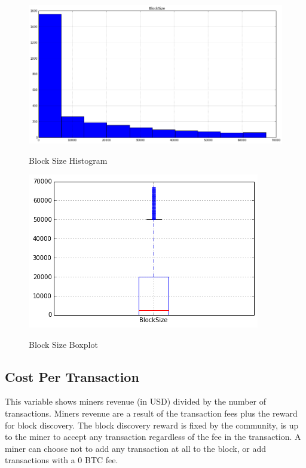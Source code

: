 \begin{figure}[bth]
  \myfloatalign
  {\includegraphics[width=1\linewidth]
    {gfx/block-size-histogram}}
  \caption{Block Size Histogram}
  \label{fig:block-size-histogram}
\end{figure}

\begin{figure}[bth]
  \myfloatalign
  {\includegraphics[width=1\linewidth]
    {gfx/block-size-boxplot}}
  \caption{Block Size Boxplot}
  \label{fig:block-size-boxplot}
\end{figure}

\clearpage

\subsection{Cost Per Transaction}
\label{sec:cost-per-transaction}

This variable shows miners revenue (in USD) divided by the number of
transactions. Miners revenue are a result of the transaction fees plus
the reward for block discovery. The block discovery reward is fixed by
the community, is up to the miner to accept any transaction regardless
of the fee in the transaction. A miner can choose not to add any
transaction at all to the block, or add transactions with a $0$
BTC fee.

